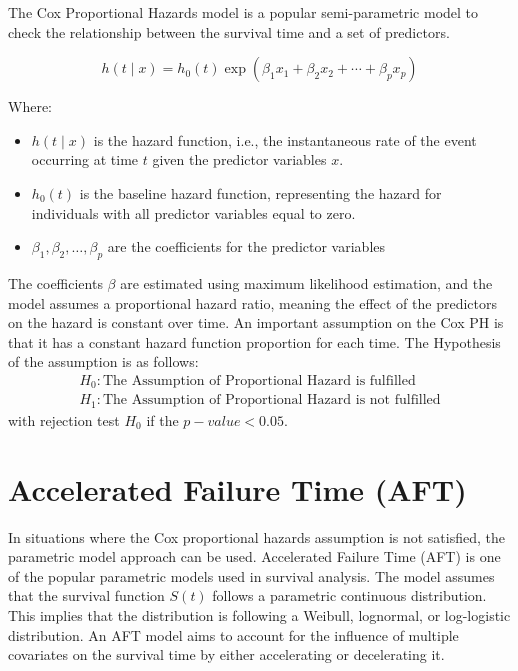 \documentclass[doublespacing]{report} [12px]%
\begin{document}
The Cox Proportional Hazards model is a popular semi-parametric model to check the relationship between the survival time and a set of predictors.

\begin{equation}
h\left(t \mid x\right) = h_0(t) \exp(\beta_1 x_1 + \beta_2 x_2 + \cdots + \beta_p x_p)
\end{equation}

Where:
 \begin{itemize}
     \item \(h(t\mid x)\) is the hazard function, i.e., the instantaneous rate of the event occurring at time \(t\) given the predictor variables \(x\).
     \item \(h_0\left(t\right)\) is the baseline hazard function, representing the hazard for individuals with all predictor variables equal to zero.
     \item \(\beta_1,\beta_2,\ldots,\beta_p\) are the coefficients for the predictor variables
 \end{itemize}

 The coefficients \(\beta\) are estimated using maximum likelihood estimation, and the model assumes a proportional hazard ratio, meaning the effect of the predictors on the hazard is constant over time.
An important assumption on the Cox PH is that it has a constant hazard function proportion for each time. The Hypothesis of the assumption is as follows: 
                 \begin{equation}
\begin{array}{c}
H_0: \text{The Assumption of Proportional Hazard is fulfilled} \\
H_1: \text{The Assumption of Proportional Hazard is not fulfilled}
\end{array}
\end{equation}
with rejection test $H_0$ if the $p-value < 0.05$.

\section{Accelerated Failure Time (AFT)}

In situations where the Cox proportional hazards assumption is not satisfied, the parametric model approach can be used. Accelerated Failure Time (AFT) is one of the popular parametric models used in survival analysis. The model assumes that the survival function \(S(t)\) follows a parametric continuous distribution. This implies that the distribution is following a Weibull, lognormal, or log-logistic distribution. An AFT model aims to account for the influence of multiple covariates on the survival time by either accelerating or decelerating it.
\end{document}
